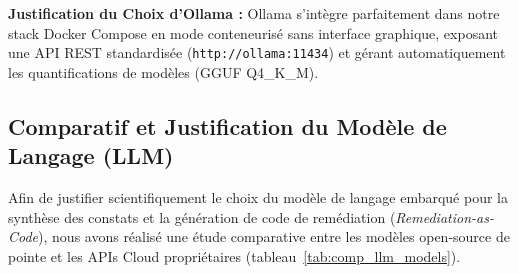 \begin{table}[H]
\centering
\caption{Analyse Comparative des Moteurs d'Inf\'erence d'IA Locale}
\label{tab:comp_ai}
%
\end{table}
\par \textbf{Justification du Choix d'Ollama :} Ollama s'int\`egre parfaitement dans notre stack Docker Compose en mode conteneuris\'e sans interface graphique, exposant une API REST standardis\'ee (\texttt{http://ollama:11434}) et g\'erant automatiquement les quantifications de mod\`eles (GGUF Q4\_K\_M).

\subsection{Comparatif et Justification du Mod\`ele de Langage (LLM)}
\par Afin de justifier scientifiquement le choix du mod\`ele de langage embarqu\'e pour la synth\`ese des constats et la g\'en\'eration de code de rem\'ediation (\textit{Remediation-as-Code}), nous avons r\'ealis\'e une \'etude comparative entre les mod\`eles open-source de pointe et les APIs Cloud propri\'etaires (tableau~\ref{tab:comp_llm_models}).


